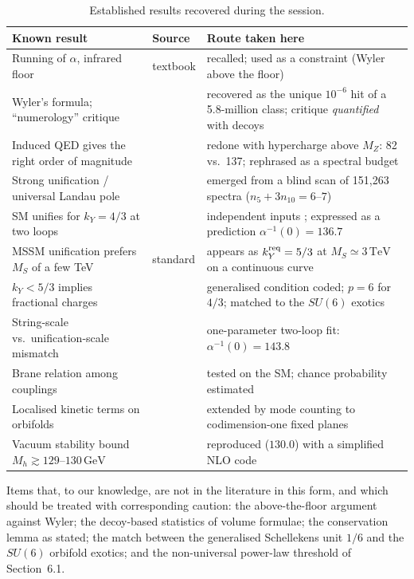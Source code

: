 \documentclass[11pt,a4paper]{article}
\newcommand{\ainv}{\alpha^{-1}}
\newcommand{\kY}{k_Y}
\newcommand{\GeV}{\,\mathrm{GeV}}
\newcommand{\TeV}{\,\mathrm{TeV}}
\begin{document}
\begin{table}[h]\centering\small
\caption{Established results recovered during the session.}\label{tab:score}
\begin{tabular}{>{\raggedright}p{4.1cm}>{\raggedright}p{3.0cm}>{\raggedright\arraybackslash}p{7.9cm}}\toprule
Known result & Source & Route taken here\\\midrule
Running of $\alpha$, infrared floor & textbook & recalled; used as a constraint (Wyler above the floor)\\
Wyler's formula; ``numerology'' critique & \cite{Wyler,Robertson} & recovered as the unique $10^{-6}$ hit of a 5.8-million class; critique \emph{quantified} with decoys\\
Induced QED gives the right order of magnitude & \cite{Landau,Zeldovich} & redone with hypercharge above $M_Z$: 82 vs.\ 137; rephrased as a spectral budget\\
Strong unification / universal Landau pole & \cite{MPP,GLR,ULP} & emerged from a blind scan of 151{,}263 spectra ($n_5+3n_{10}=6$--$7$)\\
SM unifies for $\kY=4/3$ at two loops & \cite{BJLL1,BJLL2} & independent inputs \cite{Buttazzo}; expressed as a prediction $\ainv(0)=136.7$\\
MSSM unification prefers $M_S$ of a few TeV & standard & appears as $\kY^{\rm req}=5/3$ at $M_S\simeq3\TeV$ on a continuous curve\\
$\kY<5/3$ implies fractional charges & \cite{Schellekens,DFMR} & generalised condition coded; $p=6$ for $4/3$; matched to the $SU(6)$ exotics\\
String-scale vs.\ unification-scale mismatch & \cite{Kaplunovsky,DienesReview} & one-parameter two-loop fit: $\ainv(0)=143.8$\\
Brane relation among couplings & \cite{BLS} & tested on the SM; chance probability estimated\\
Localised kinetic terms on orbifolds & \cite{GNH1,GNH2,GLS,Lee6D} & extended by mode counting to codimension-one fixed planes\\
Vacuum stability bound $M_h\gtrsim129$--$130\GeV$ & \cite{Degrassi,Buttazzo} & reproduced ($130.0$) with a simplified NLO code\\\bottomrule
\end{tabular}\end{table}

Items that, to our knowledge, are not in the literature in this form, and which should be treated with corresponding caution:
the above-the-floor argument against Wyler; the decoy-based statistics of volume formulae; the conservation lemma as stated;
the match between the generalised Schellekens unit $1/6$ and the $SU(6)$ orbifold exotics; and the non-universal power-law
threshold of Section~6.1.
\end{document}
